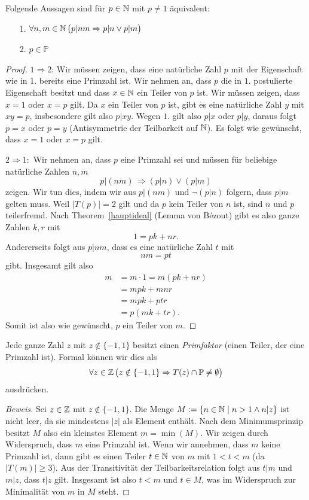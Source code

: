 \begin{satz}\label{lm:lemmavoneuklid}
Folgende Aussagen sind für $p\in\mathbb{N}$ mit $p\neq 1$ äquivalent:
\begin{enumerate}
\item[1.] $\forall n,m\in\mathbb{N}\,\big(p|nm\Rightarrow p|n\vee p|m\big)$
\item[2.] $p\in\mathbb{P}$
\end{enumerate}
\end{satz}
\begin{proof}
 $1\Rightarrow 2$: Wir müssen zeigen, dass eine natürliche Zahl $p$ mit der Eigenschaft wie in $1.$ bereits eine Primzahl ist. Wir nehmen an, dass $p$ die in $1.$ postulierte Eigenschaft besitzt und dass $x\in \mathbb{N}$ ein Teiler von $p$ ist. Wir müssen zeigen, dass $x=1$ oder $x=p$ gilt. Da $x$ ein Teiler von $p$ ist, gibt es eine natürliche Zahl $y$ mit $xy=p$, insbesondere gilt also $p|xy$. Wegen $1.$ gilt also $p|x$ oder $p|y$, daraus folgt $p=x$ oder $p=y$ (Antisymmetrie der Teilbarkeit auf $\mathbb{N}$). Es folgt wie gewünscht, dass $x=1$ oder $x=p$ gilt.

$2\Rightarrow 1:$ Wir nehmen an, dass $p$ eine Primzahl sei und müssen für beliebige natürliche Zahlen $n,m$
\[
p|(nm)\,\Rightarrow (p|n)\lor(p|m)
\]
zeigen. Wir tun dies, indem wir aus $p|(nm)$ und $\neg (p|n)$ folgern, dass $p|m$ gelten muss. Weil $|T(p)|=2$ gilt und da $p$ kein Teiler von $n$ ist, sind $n$ und $p$ teilerfremd. Nach Theorem~\ref{hauptideal} (Lemma von Bézout) gibt es also ganze Zahlen $k,r$ mit
\[
 1=pk+nr.
\]
Andererseits folgt aus $p|nm$, dass es eine natürliche Zahl $t$ mit
\[
 nm=pt
\]
gibt. Insgesamt gilt also
\begin{align*}
m&=m\cdot 1=m(pk+nr)\\
&=mpk+mnr\\
&=mpk+ptr\\
&=p(mk+tr).
\end{align*}
Somit ist also wie gewünscht, $p$ ein Teiler von $m$.
\end{proof}

\begin{satz}\label{Primteiler}
 Jede ganze Zahl $z$ mit $z\notin\{-1,1\}$ besitzt einen \textit{Primfaktor} (einen Teiler, der eine Primzahl ist). Formal können wir dies als
\[
\forall z\in\mathbb{Z}\,\big(z\notin\{-1,1\}\Rightarrow T(z)\cap\mathbb{P}\neq\emptyset\big)
\]
ausdrücken.
\end{satz}
\begin{proof}[Beweis]
 Sei $z\in\mathbb{Z}$ mit $z\notin\{-1,1\}$. Die Menge $M:=\{n\in\mathbb{N}\mid n>1\wedge n|z\}$ ist nicht leer, da sie mindestens $|z|$ als Element enthält. Nach dem Minimumsprinzip besitzt $M$ also ein kleinstes Element $m=\min(M)$. Wir zeigen durch Widerspruch, dass $m$ eine Primzahl ist. Wenn wir annehmen, dass $m$ keine Primzahl ist, dann gibt es einen Teiler $t\in\mathbb{N}$ von $m$ mit $1<t<m$ (da $|T(m)|\geq 3$). Aus der Transitivität der Teilbarkeitsrelation folgt aus $t|m$ und $m|z$, dass $t|z$ gilt. Insgesamt ist also $t<m$ und $t\in M$, was im Widerspruch zur Minimalität von $m$ in $M$ steht.
\end{proof}

